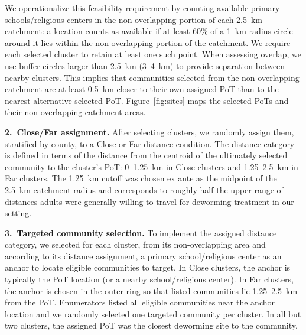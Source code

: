 We operationalize this feasibility requirement by counting available primary schools/religious centers in the non-overlapping portion of each 2.5~km catchment: a location counts as available if at least 60\% of a 1~km radius circle around it lies within the non-overlapping portion of the catchment. We require each selected cluster to retain at least one such point. When assessing overlap, we use buffer circles larger than 2.5~km (3--4~km) to provide separation between nearby clusters. This implies that communities selected from the non-overlapping catchment are at least 0.5~km closer to their own assigned PoT than to the nearest alternative selected PoT. Figure~\ref{fig:sites} maps the selected PoTs and their non-overlapping catchment areas.

\vspace{0.4em}
\noindent\textbf{2.\ Close/Far assignment.}
After selecting clusters, we randomly assign them, stratified by county, to a Close or Far distance condition. The distance category is defined in terms of the distance from the centroid of the ultimately selected community to the cluster's PoT: 0--1.25~km in Close clusters and 1.25--2.5~km in Far clusters. The 1.25~km cutoff was chosen ex ante as the midpoint of the 2.5~km catchment radius and corresponds to roughly half the upper range of distances adults were generally willing to travel for deworming treatment in our setting.

\vspace{0.4em}
\noindent\textbf{3.\ Targeted community selection.}
To implement the assigned distance category, we selected for each cluster, from its non-overlapping area and according to its distance assignment, a primary school/religious center as an anchor to locate eligible communities to target. In Close clusters, the anchor is typically the PoT location (or a nearby school/religious center). In Far clusters, the anchor is chosen in the outer ring so that listed communities lie 1.25--2.5~km from the PoT. Enumerators listed all eligible communities near the anchor location and we randomly selected one targeted community per cluster. In all but two clusters, the assigned PoT was the closest deworming site to the community. 
